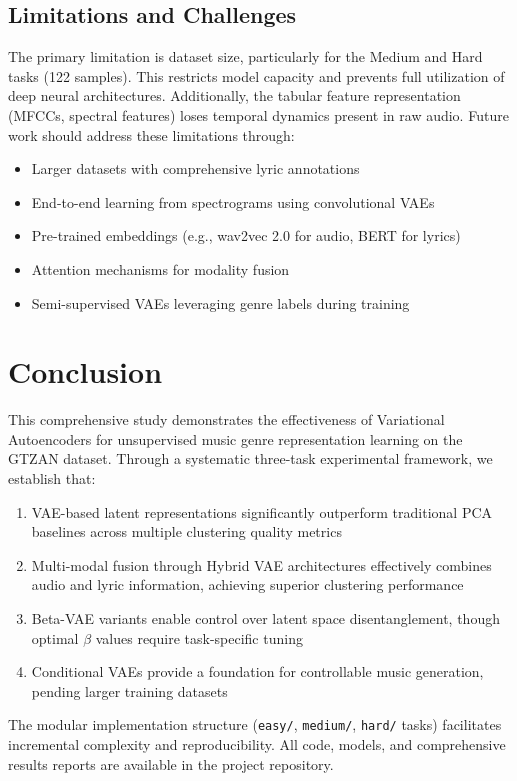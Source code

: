 \documentclass[11pt]{article}
\begin{document}
\subsection{Limitations and Challenges}
The primary limitation is dataset size, particularly for the Medium and Hard tasks (122 samples). This restricts model capacity and prevents full utilization of deep neural architectures. Additionally, the tabular feature representation (MFCCs, spectral features) loses temporal dynamics present in raw audio. Future work should address these limitations through:
\begin{itemize}
\item Larger datasets with comprehensive lyric annotations
\item End-to-end learning from spectrograms using convolutional VAEs
\item Pre-trained embeddings (e.g., wav2vec 2.0 for audio, BERT for lyrics)
\item Attention mechanisms for modality fusion
\item Semi-supervised VAEs leveraging genre labels during training
\end{itemize}

\section{Conclusion}
This comprehensive study demonstrates the effectiveness of Variational Autoencoders for unsupervised music genre representation learning on the GTZAN dataset. Through a systematic three-task experimental framework, we establish that:

\begin{enumerate}
\item VAE-based latent representations significantly outperform traditional PCA baselines across multiple clustering quality metrics
\item Multi-modal fusion through Hybrid VAE architectures effectively combines audio and lyric information, achieving superior clustering performance
\item Beta-VAE variants enable control over latent space disentanglement, though optimal $\beta$ values require task-specific tuning
\item Conditional VAEs provide a foundation for controllable music generation, pending larger training datasets
\end{enumerate}

The modular implementation structure (\texttt{easy/}, \texttt{medium/}, \texttt{hard/} tasks) facilitates incremental complexity and reproducibility. All code, models, and comprehensive results reports are available in the project repository.
\end{document}
